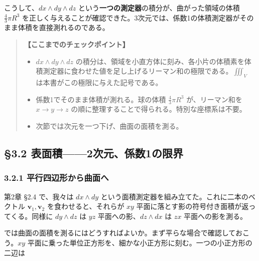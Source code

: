 \documentclass[a4paper,12pt,openany]{book}
\begin{document}
こうして、\(dx \wedge dy \wedge dz\)
という\textbf{一つの測定器}の積分が、曲がった領域の体積
\(\frac{4}{3}\pi R^3\)
を正しく与えることが確認できた。3次元では、係数1の体積測定器がそのまま体積を直接測れるのである。

\begin{quote}
\textbf{【ここまでのチェックポイント】}

\begin{itemize}
\item
  \(dx \wedge dy \wedge dz\)
  の積分は、領域を小直方体に刻み、各小片の体積素を体積測定器に食わせた値を足し上げるリーマン和の極限である。\(\iiint_V\)
  は本書がこの極限に与えた記号である。
\item
  係数1でそのまま体積が測れる。球の体積 \(\frac{4}{3}\pi R^3\)
  が、リーマン和を \(x \to y \to z\)
  の順に整理することで得られる。特別な座標系は不要。
\item
  次節では次元を一つ下げ、曲面の面積を測る。
\end{itemize}
\end{quote}

\par\vspace{0.35em}\par

\hypertarget{ux8868ux9762ux7a4d2ux6b21ux5143ux4fc2ux65701ux306eux9650ux754c}{%
\subsection{§3.2
表面積——2次元、係数1の限界}\label{ux8868ux9762ux7a4d2ux6b21ux5143ux4fc2ux65701ux306eux9650ux754c}}

\hypertarget{ux5e73ux884cux56dbux8fbaux5f62ux304bux3089ux66f2ux9762ux3078}{%
\subsubsection{3.2.1
平行四辺形から曲面へ}\label{ux5e73ux884cux56dbux8fbaux5f62ux304bux3089ux66f2ux9762ux3078}}

第2章 §2.4 で、我々は \(dx \wedge dy\)
という面積測定器を組み立てた。これに二本のベクトル
\(\mathbf{v}_1, \mathbf{v}_2\) を食わせると、それらが \(xy\)
平面に落とす影の符号付き面積が返ってくる。同様に \(dy \wedge dz\) は
\(yz\) 平面への影、\(dz \wedge dx\) は \(zx\) 平面への影を測る。

では曲面の面積を測るにはどうすればよいか。まず平らな場合で確認しておこう。\(xy\)
平面に乗った単位正方形を、細かな小正方形に刻む。一つの小正方形の二辺は
\end{document}
